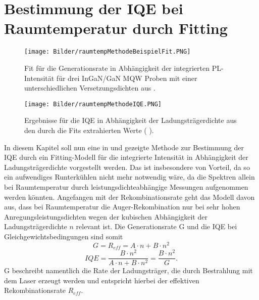 
\section{Bestimmung der IQE bei Raumtemperatur durch Fitting}
\label{chap:grundfitting}
\thispagestyle{fancy}

\begin{figure}[htb]
    \centering
    \begin{minipage}[t]{0.49\linewidth}
        \centering
        \texttt{[image: Bilder/raumtempMethodeBeispielFit.PNG]}
        \caption{Fit für die Generationsrate in Abhängigkeit der integrierten PL-Intensität für drei InGaN/GaN MQW Proben mit einer unterschiedlichen Versetzungsdichten aus \cite{doi:10.1063/1.3100773}.}
    \end{minipage}%
    \hfill
    \begin{minipage}[t]{0.49\linewidth}
        \centering
        \texttt{[image: Bilder/raumtempMethodeIQE.PNG]}
        \caption{Ergebnisse für die IQE in Abhängigkeit der Ladungsträgerdichte aus den durch die Fits extrahierten Werte ( \cite{doi:10.1063/1.3100773}). }
        \label{fig:iqert}
    \end{minipage}
\end{figure}
\noindent
In diesem Kapitel soll nun eine in \cite{doi:10.1063/1.3100773} und \cite{doi:10.1063/1.4917540} gezeigte Methode zur Bestimmung der IQE durch ein Fitting-Modell für die integrierte Intensität in Abhängigkeit der Ladungsträgerdichte vorgestellt werden. Das ist insbesondere von Vorteil, da so ein aufwendiges Runterkühlen nicht mehr notwendig wäre, da die Spektren allein bei Raumtemperatur durch leistungsdichteabhängige Messungen aufgenommen werden könnten. 
\newline
Angefangen mit der Rekombinationsrate geht das Modell davon aus,
dass bei Raumtemperatur die Auger-Rekombination nur bei sehr hohen Anregungsleistungsdichten wegen der kubischen Abhängigkeit der Ladungsträgerdichte $n$ relevant ist. Die Generationsrate G und die IQE bei Gleichgewichtsbedingungen sind somit
\begin{equation}
    G = R_{eff} = A \cdot n + B \cdot n^2
    \label{eq:generationrate}
\end{equation}  
\begin{equation}
    IQE = \frac{B\cdot n^2}{A \cdot n + B \cdot n^2} = \frac{B\cdot n^2}{G}.
    \label{eq:iqe2}
\end{equation}  
G beschreibt namentlich die Rate der Ladungsträger, die durch Bestrahlung mit dem Laser erzeugt werden und entspricht hierbei der effektiven Rekombinationsrate $R_{eff}$.
